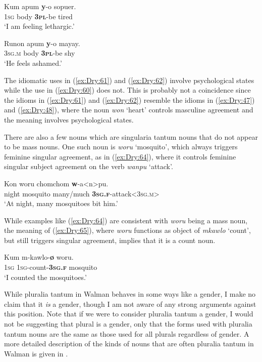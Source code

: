 \documentclass[output=collectionpaper]{langsci/langscibook}
\begin{document}
\ea \label{ex:Dry:61}
\gll Kum	apum	\textbf{y}-o	sopuer.\\
\textsc{1sg} body \textbf{\textsc{3pl}}-be tired\\
\glt  `I am feeling lethargic.'
\z

\ea \label{ex:Dry:62}
\gll Runon	apum	\textbf{y}-o	mayay.\\
\textsc{3sg.m} body \textbf{\textsc{3pl}}-be shy\\
\glt  `He feels ashamed.'
\z

The idiomatic uses in (\ref{ex:Dry:61}) and (\ref{ex:Dry:62}) involve psychological states while the use in (\ref{ex:Dry:60}) does not. This is probably not a coincidence since the idioms in (\ref{ex:Dry:61}) and (\ref{ex:Dry:62}) resemble the idioms in (\ref{ex:Dry:47}) and (\ref{ex:Dry:48}), where the noun \textit{won} `heart' controls masculine agreement and the meaning involves psychological states.

There are also a few nouns which are singularia tantum nouns that do not appear to be mass nouns. One such noun is \textit{woru} `mosquito', which always triggers feminine singular agreement, as in (\ref{ex:Dry:64}), where it controls feminine singular subject agreement on the verb \textit{wanpu} `attack'.

\ea    \label{ex:Dry:64}
\gll Kon	woru	chomchom	\textbf{w}-a<n>pu.\\
night mosquito many/much \textbf{\textsc{3sg.f}}-attack<\textsc{3sg.m}>\\
\glt `At night, many mosquitoes bit him.'
\z

While examples like (\ref{ex:Dry:64}) are consistent with \textit{woru} being a mass noun, the meaning of (\ref{ex:Dry:65}), where \textit{woru} functions as object of \textit{mkawlo} `count', but still triggers singular agreement, implies that it is a count noun.

\ea \label{ex:Dry:65}
\gll Kum	m-kawlo-\textbf{ø}	woru.\\
\textsc{1sg} \textsc{1sg}-count-\textbf{\textsc{3sg.f}} mosquito\\
\glt  `I counted the mosquitoes.'
\z

While pluralia tantum in Walman behaves in some ways like a gender, I make no claim that it \textit{is} a gender, though I am not aware of any strong arguments against this position. Note that if we were to consider pluralia tantum a gender, I would not be suggesting that plural is a gender, only that the forms used with pluralia tantum nouns are the same as those used for all plurals regardless of gender. A more detailed description of the kinds of nouns that are often pluralia tantum in Walman is given in \citet{DryerInpreparation}.
\end{document}
